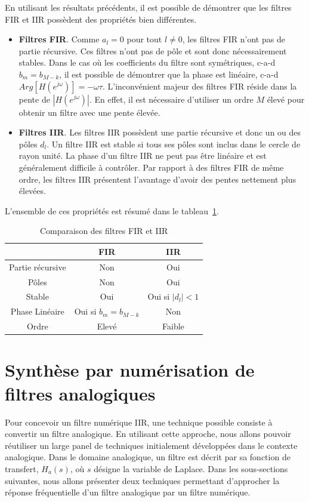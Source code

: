 \documentclass[11pt,a4paper]{IEEEtran}
\begin{document}
En utilisant les résultats précédents, il est possible de démontrer que les filtres FIR et IIR possèdent des propriétés bien différentes.
\begin{itemize}
\item \textbf{Filtres FIR}. Comme $a_l=0$ pour tout $l\ne 0$, les filtres FIR n'ont pas de partie récursive. Ces filtres n'ont pas de pôle et sont donc nécessairement stables. Dans le cas où les coefficients du filtre sont symétriques, c-a-d $b_m=b_{M-k}$, il est possible de démontrer que la phase est linéaire, c-a-d $Arg[H(e^{j\omega})]=-\omega \tau$. L'inconvénient majeur des filtres FIR réside dans la pente de $|H(e^{j\omega})|$. En effet, il est nécessaire d'utiliser un ordre $M$ élevé pour obtenir un filtre avec une pente élevée.
\item \textbf{Filtres IIR}. Les filtres IIR possèdent une partie récursive et donc un ou des pôles $d_l$. Un filtre IIR est stable si tous ses pôles sont inclus dans le cercle de rayon unité. La phase d'un filtre IIR ne peut pas être linéaire et est généralement difficile à contrôler. Par rapport à des filtres FIR de même ordre, les filtres IIR présentent l'avantage d'avoir des pentes nettement plus élevées. 
\end{itemize}
L'ensemble de ces propriétés est résumé dans le tableau~\ref{t_comp_filtres}.
\begin{table}
\centering
\begin{tabular}{ccc}
& FIR & IIR \\
\hline
Partie récursive  & Non & Oui\\
Pôles & Non & Oui \\
Stable & Oui & Oui si $|d_l|<1$\\
Phase Linéaire & Oui si  $b_m=b_{M-k}$& Non\\
Ordre & Elevé & Faible \\
\hline
\end{tabular}
\caption{Comparaison des filtres FIR et IIR}\label{t_comp_filtres}
\end{table}



\section{Synthèse par numérisation de filtres analogiques}

Pour concevoir un filtre numérique IIR, une technique possible consiste à convertir un filtre analogique. En utilisant cette approche, nous allons pouvoir réutiliser un large panel de techniques initialement développées dans le contexte analogique. Dans le domaine analogique, un filtre est décrit par sa fonction de transfert, $H_a(s)$, où $s$ désigne la variable de Laplace. Dans les sous-sections suivantes, nous allons présenter deux techniques permettant d'approcher la réponse fréquentielle d'un filtre analogique par un filtre numérique. 
\end{document}
